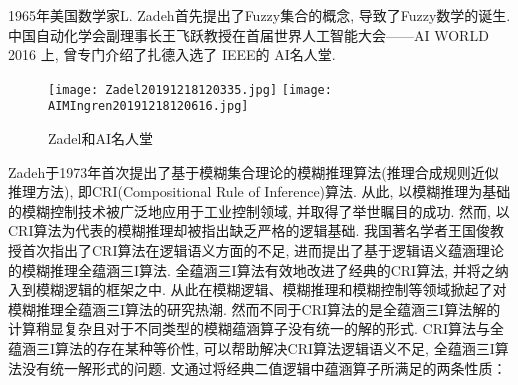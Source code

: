 1965年美国数学家L. Zadeh首先提出了Fuzzy集合的概念, 导致了Fuzzy数学的诞生.  中国自动化学会副理事长王飞跃教授在首届世界人工智能大会——AI WORLD 2016 上, 曾专门介绍了扎德入选了 IEEE的 AI名人堂.
\begin{figure}[H]
\centering
\texttt{[image: Zadel20191218120335.jpg]}
\texttt{[image: AIMIngren20191218120616.jpg]}
\caption{Zadel和AI名人堂}
\label{Zadel20191218120335}
\end{figure}
%
%
%
%
%
%
%
Zadeh于1973年首次提出了基于模糊集合理论的模糊推理算法(推理合成规则近似推理方法), 即CRI(Compositional Rule of Inference)算法. 从此, 以模糊推理为基础的模糊控制技术被广泛地应用于工业控制领域, 并取得了举世瞩目的成功. 然而, 以CRI算法为代表的模糊推理却被指出缺乏严格的逻辑基础. 我国著名学者王国俊教授首次指出了CRI算法在逻辑语义方面的不足, 进而提出了基于逻辑语义蕴涵理论的模糊推理全蕴涵三I算法. 全蕴涵三I算法有效地改进了经典的CRI算法, 并将之纳入到模糊逻辑的框架之中. 从此在模糊逻辑、模糊推理和模糊控制等领域掀起了对模糊推理全蕴涵三I算法的研究热潮. 然而不同于CRI算法的是全蕴涵三I算法解的计算稍显复杂且对于不同类型的模糊蕴涵算子没有统一的解的形式. CRI算法与全蕴涵三I算法的存在某种等价性, 可以帮助解决CRI算法逻辑语义不足, 全蕴涵三I算法没有统一解形式的问题.
文\cite{江欢 2009全蕴涵三I算法}通过将经典二值逻辑中蕴涵算子所满足的两条性质：

